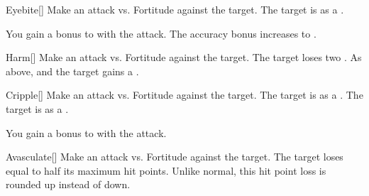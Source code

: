 \lowercase{\hypertarget{spell:Eyebite}{}}\label{spell:Eyebite}
\begin{freeability}[Rank 5]{\hypertarget{spell:Eyebite}{Eyebite}}[]
Make an attack vs. Fortitude against the target.
\hit The target is  as a .

\rankline
{} You gain a  bonus to  with the attack.
 The accuracy bonus increases to .
\end{freeability}
\vspace{0.25em}



\lowercase{\hypertarget{spell:Harm}{}}\label{spell:Harm}
\begin{freeability}[Rank 5]{\hypertarget{spell:Harm}{Harm}}[]
Make an attack vs. Fortitude against the target.
\hit The target loses two .
\crit As above, and the target gains a .
\end{freeability}
\vspace{0.25em}



\lowercase{\hypertarget{spell:Cripple}{}}\label{spell:Cripple}
\begin{freeability}[Rank 6]{\hypertarget{spell:Cripple}{Cripple}}[]
Make an attack vs. Fortitude against the target.
\hit The target is  as a .
\crit The target is  as a .

\rankline
{} You gain a  bonus to  with the attack.
\end{freeability}
\vspace{0.25em}



\lowercase{\hypertarget{spell:Avasculate}{}}\label{spell:Avasculate}
\begin{freeability}[Rank 8]{\hypertarget{spell:Avasculate}{Avasculate}}[]
Make an attack vs. Fortitude against the target.
\hit The target loses  equal to half its maximum hit points.
Unlike normal, this hit point loss is rounded up instead of down.
\end{freeability}
\vspace{0.25em}




